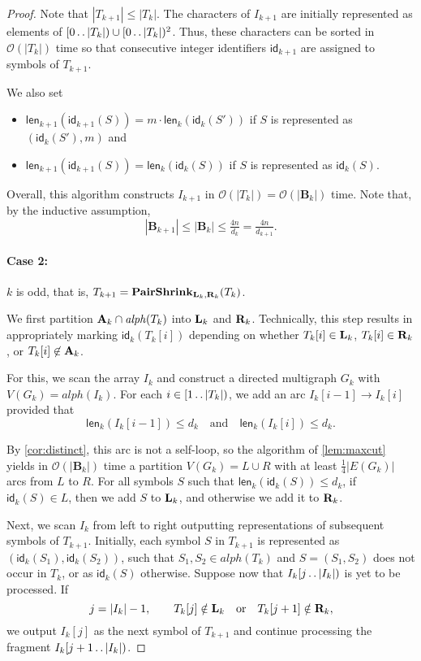 \documentclass[a4paper]{article}
\theoremstyle{definition}
\theoremstyle{remark}
\newcommand{\B}{\mathbf{B}}
\newcommand{\dd}{\mathinner{\ldotp\ldotp}}
\newcommand{\aalph}{\mathit{alph}}
\newcommand{\Oh}{\mathcal{O}}
\newcommand{\id}{\mathsf{id}}
\newcommand{\len}{\mathsf{len}}
\begin{document}
\begin{proof}
Note that $|T_{k+1}|\le |T_{k}|$. The characters of $I_{k+1}$ are initially represented as elements of $[0\dd |T_{k}|)\cup [0\dd |T_{k}|)^2$. Thus, these characters can be sorted in $\Oh(|T_{k}|)$ time so that consecutive integer identifiers $\id_{k+1}$ are assigned to symbols of $T_{k+1}$. 

We also set 
\begin{itemize}
\item 
$\len_{k+1}(\id_{k+1}(S))=m\cdot \len_{k}(\id_{k}(S'))$ if $S$ is represented as $(\id_{k}(S'),m)$ and 

\item $\len_{k+1}(\id_{k+1}(S))=\len_{k}(\id_{k}(S))$ if $S$ is represented as $\id_{k}(S)$.
\end{itemize}

Overall, this algorithm constructs $I_{k+1}$ in $\Oh(|T_{k}|) = \Oh(|\B_{k}|)$ time.
Note that, by the inductive assumption,
\[|\B_{k+1}|\le |\B_{k}| \le \tfrac{4n}{d_{k}}=\tfrac{4n}{d_{k+1}}.\]

\paragraph{Case 2:} $k$ is odd, that is, $T_{k+1}=\mathsf{\mathbf{PairShrink}}_{\mathbf{L}_{k},\mathbf{R}_{k}}(T_{k})$.

We first partition $\Act_{k}\cap \aalph(T_{k})$ into $\mathbf{L}_{k}$ and $\mathbf{R}_{k}$.
Technically, this step results in appropriately marking $\id_{k}(T_k[i])$ depending on whether $T_k[i]\in \mathbf{L}_{k}$,
$T_k[i]\in \mathbf{R}_{k}$, or $T_k[i] \not\in \mathbf{A}_k$.

For this, we scan the array $I_{k}$ and construct a directed multigraph $G_{k}$ with $V(G_{k})=\aalph(I_{k})$.
For each $i\in [1\dd |T_{k}|)$, we add an arc $I_{k}[i-1]\to I_{k}[i]$
provided that 
\[\len_{k}(I_{k}[i-1])\le d_{k}\quad \text{and}\quad\len_{k}(I_{k}[i])\le d_{k}.\]

By \cref{cor:distinct}, this arc is not a self-loop,
so the algorithm of \cref{lem:maxcut} yields in $\Oh(|\B_{k}|)$ time a partition $V(G_{k})=L\cup R$ with at least $\tfrac14|E(G_{k})|$
arcs from $L$ to $R$. For all symbols $S$ such that $\len_{k}(\id_{k}(S))\le d_{k}$, if $\id_{k}(S)\in L$, then we add $S$ to $\mathbf{L}_{k}$,
and otherwise we add it to $\mathbf{R}_{k}$.

Next, we scan $I_{k}$ from left to right outputting representations of subsequent symbols of $T_{k+1}$.
Initially, each symbol $S$ in $T_{k+1}$ is represented as $(\id_{k}(S_1),\id_{k}(S_2))$, such that $S_1,S_2 \in \aalph(T_{k})$ and $S=(S_1,S_2)$ does not occur in $T_{k}$, or as $\id_{k}(S)$ otherwise.
Suppose now that $I_{k}[j\dd |I_{k}|)$ is yet to be processed.
 If
 \[j=|I_{k}|-1, \qquad T_{k}[j]\notin \mathbf{L}_{k}\quad\text{or}\quad T_{k}[j+1]\notin \mathbf{R}_{k},\]
we output $I_{k}[j]$ as the next symbol of $T_{k+1}$ and continue processing 
the fragment $I_{k}[j+1\dd |I_{k}|)$.


\end{proof}
\end{document}
